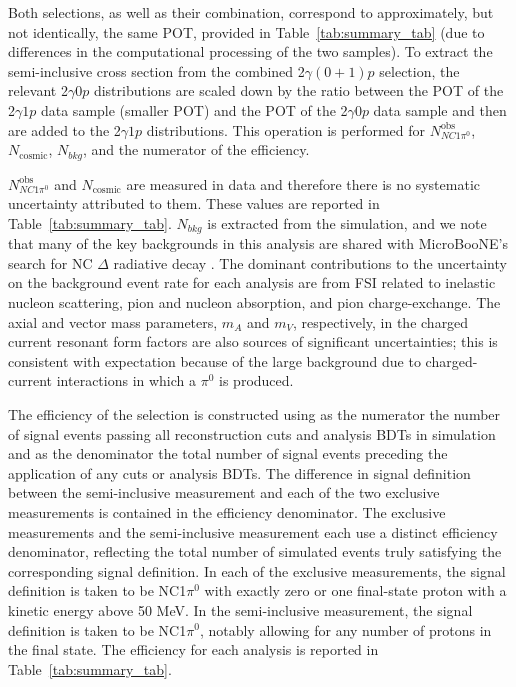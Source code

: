 Both selections, as well as their combination, correspond to approximately, but not identically, the same POT, provided in Table~\ref{tab:summary_tab} (due to differences in the computational processing of the two samples). To extract the semi-inclusive cross section from the combined 2$\gamma(0+1)p$ selection, the relevant 2$\gamma0p$ distributions are scaled down by the ratio between the POT of the 2$\gamma1p$ data sample (smaller POT) and the POT of the 2$\gamma0p$ data sample and then are added to the 2$\gamma1p$ distributions. This operation is performed for $N^\text{obs}_{NC1\pi^0}$, $N_\text{cosmic}$, $N_{bkg}$, and the numerator of the efficiency. 

$N^\text{obs}_{NC1\pi^0}$ and $N_\text{cosmic}$ are measured in data and therefore there is no systematic uncertainty attributed to them. These values are reported in Table~\ref{tab:summary_tab}. $N_{bkg}$ is extracted from the simulation, and we note that many of the key backgrounds in this analysis are shared with MicroBooNE's search for NC $\Delta$ radiative decay \cite{MicroBooNE:2021zai}. The dominant contributions to the uncertainty on the background event rate for each analysis are from FSI related to inelastic nucleon scattering, pion and nucleon absorption, and pion charge-exchange. The axial and vector mass parameters, $m_A$ and $m_V$, respectively, in the charged current resonant form factors are also sources of significant uncertainties; this is consistent with expectation because of the large background due to charged-current interactions in which a $\pi^0$ is produced. 

The efficiency of the selection is constructed using as the numerator the number of signal events passing all reconstruction cuts and analysis BDTs in simulation and as the denominator the total number of signal events preceding the application of any cuts or analysis BDTs. The difference in signal definition between the semi-inclusive measurement and each of the two exclusive measurements is contained in the efficiency denominator. The exclusive measurements and the semi-inclusive measurement each use a distinct efficiency denominator, reflecting the total number of simulated events truly satisfying the corresponding signal definition. In each of the exclusive measurements, the signal definition is taken to be NC1$\pi^{0}$ with exactly zero or one final-state proton with a kinetic energy above 50 MeV. In the semi-inclusive measurement, the signal definition is taken to be NC1$\pi^{0}$, notably allowing for any number of protons in the final state. The efficiency for each analysis is reported in Table~\ref{tab:summary_tab}.

